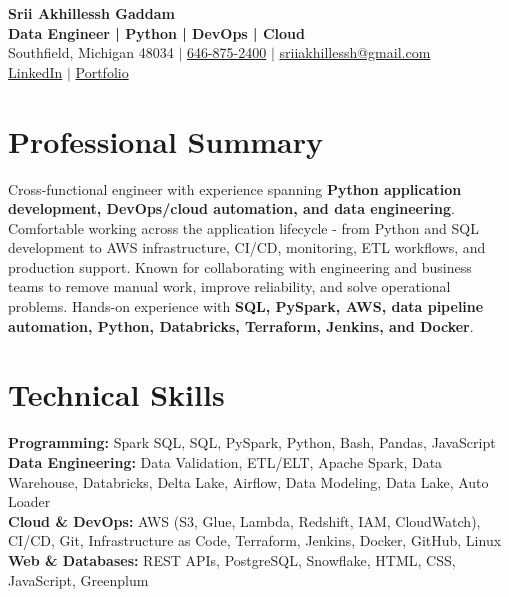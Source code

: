 \documentclass[letterpaper,10pt]{article}
\begin{document}
\fontsize{9.35pt}{10.45pt}\selectfont

\begin{center}
    {\LARGE \textbf{Srii Akhillessh Gaddam}} \\[-1pt]
    \textbf{Data Engineer | Python | DevOps | Cloud} \\[2pt]
    Southfield, Michigan 48034 $|$
    \href{tel:6468752400}{646-875-2400} $|$
    \href{mailto:sriiakhillessh@gmail.com}{sriiakhillessh@gmail.com} \\[1pt]
    \href{https://www.linkedin.com/in/srii-akhiilessh-gaddam-b48668191/}{LinkedIn} $|$
    \href{https://sriiakhillesshg.github.io/portfolio/}{Portfolio}
\end{center}
\vspace{-8pt}

\section{Professional Summary}
\small{Cross-functional engineer with experience spanning \textbf{Python application development, DevOps/cloud automation, and data engineering}. Comfortable working across the application lifecycle - from Python and SQL development to AWS infrastructure, CI/CD, monitoring, ETL workflows, and production support. Known for collaborating with engineering and business teams to remove manual work, improve reliability, and solve operational problems. Hands-on experience with \textbf{SQL, PySpark, AWS, data pipeline automation, Python, Databricks, Terraform, Jenkins, and Docker}.}

\section{Technical Skills}
\small{
\textbf{Programming:} Spark SQL, SQL, PySpark, Python, Bash, Pandas, JavaScript \\
\textbf{Data Engineering:} Data Validation, ETL/ELT, Apache Spark, Data Warehouse, Databricks, Delta Lake, Airflow, Data Modeling, Data Lake, Auto Loader \\
\textbf{Cloud \& DevOps:} AWS (S3, Glue, Lambda, Redshift, IAM, CloudWatch), CI/CD, Git, Infrastructure as Code, Terraform, Jenkins, Docker, GitHub, Linux \\
\textbf{Web \& Databases:} REST APIs, PostgreSQL, Snowflake, HTML, CSS, JavaScript, Greenplum
}
\end{document}
